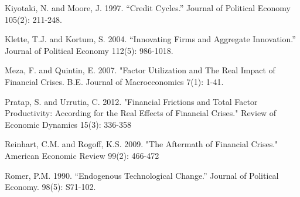 \documentclass{article}
\begin{document}
\begin{thebibliography}{9}
    \item Kiyotaki, N. and Moore, J. 1997. “Credit Cycles.” Journal of Political Economy 105(2): 211-248.
    \item Klette, T.J. and Kortum, S. 2004. “Innovating Firms and Aggregate Innovation.” Journal of Political Economy 112(5): 986-1018.
    \item Meza, F. and Quintin, E. 2007. "Factor Utilization and The Real Impact of Financial Crises. B.E. Journal of Macroeconomics 7(1): 1-41.
    \item Pratap, S. and Urrutia, C. 2012. "Financial Frictions and Total Factor Productivity: According for the Real Effects of Financial Crises." Review of Economic Dynamics 15(3): 336-358
    \item Reinhart, C.M. and Rogoff, K.S. 2009. "The Aftermath of Financial Crises." American Economic Review 99(2): 466-472
    \item Romer, P.M. 1990. “Endogenous Technological Change.” Journal of Political Economy. 98(5): S71-102.
\end{thebibliography}
\end{document}
